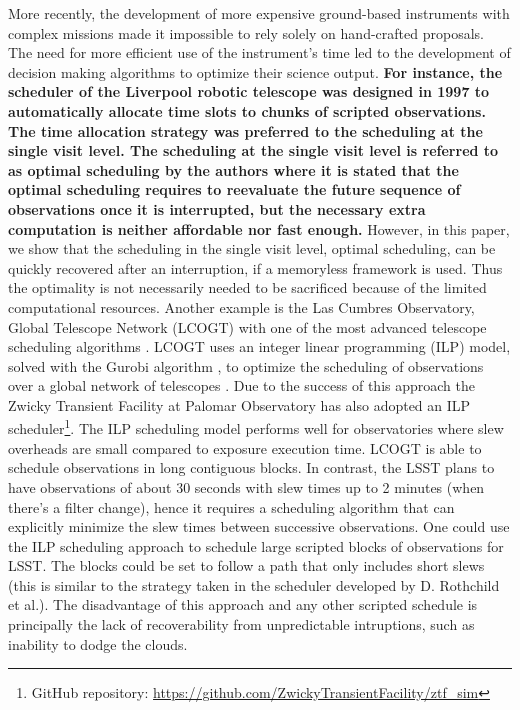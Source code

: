 \documentclass[12pt]{aastex62}
\theoremstyle{definition}
\begin{document}
More recently, the development of more expensive ground-based instruments with complex missions made it impossible to rely solely on hand-crafted proposals. The need for more efficient use of the instrument's time led to the development of decision making algorithms to optimize their science output. {\bf For instance, the scheduler of the Liverpool robotic telescope was designed in 1997 to automatically allocate time slots to chunks of scripted observations. The time allocation strategy was preferred to the scheduling at the single visit level. The scheduling at the single visit level is referred to as optimal scheduling by the authors \citep{steele1997control} where it is stated that the optimal scheduling requires to reevaluate the future sequence of observations once it is interrupted, but the necessary extra computation is neither affordable nor fast enough.\bf} However, in this paper, we show that the scheduling in the single visit level, optimal scheduling, can be quickly recovered after an interruption, if a memoryless framework is used. Thus the optimality is not necessarily needed to be sacrificed because of the limited computational resources. Another example is the Las Cumbres Observatory, Global Telescope Network (LCOGT) with one of the most advanced telescope scheduling algorithms \citep{Boroson14, Saunders14}. LCOGT uses an integer linear programming (ILP) model, solved with the Gurobi algorithm \citep{gurobi}, to optimize the scheduling of observations over a global network of telescopes \citep{Lampoudi15}. Due to the success of this approach the Zwicky Transient Facility at Palomar Observatory \citep{Bellm14} has also adopted an ILP scheduler\footnote{GitHub repository: \url{https://github.com/ZwickyTransientFacility/ztf_sim}}. The ILP scheduling model performs well for observatories where slew overheads are small compared to exposure execution time. LCOGT is able to schedule observations in long contiguous blocks. In contrast, the LSST plans to have observations of about 30 seconds with slew times up to 2 minutes (when there's a filter change), hence it requires a scheduling algorithm that can explicitly minimize the slew times between successive observations. One could use the ILP scheduling approach to schedule large scripted blocks of observations for LSST. The blocks could be set to follow a path that only includes short slews (this is similar to the strategy taken in the scheduler developed by D. Rothchild et al.). The disadvantage of this approach and any other scripted schedule is principally the lack of recoverability from unpredictable intruptions, such as inability to dodge the clouds.
\end{document}
